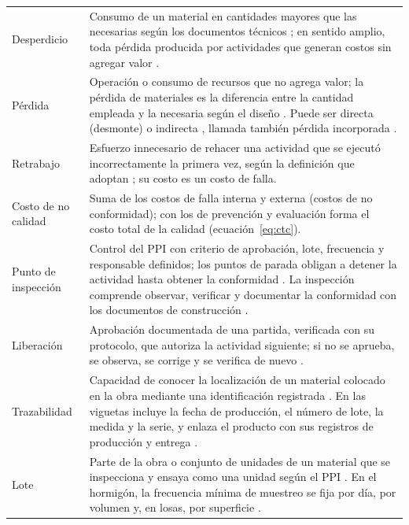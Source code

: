 \begin{longtable}{@{}P{3.1cm}P{12.7cm}@{}}
\addlinespace
Desperdicio & Consumo de un material en cantidades mayores que las necesarias según los documentos técnicos \parencite[p.~9]{galarza2011}; en sentido amplio, toda pérdida producida por actividades que generan costos sin agregar valor \parencite[p.~328]{formoso1999}. \\
\addlinespace
Pérdida & Operación o consumo de recursos que no agrega valor; la pérdida de materiales es la diferencia entre la cantidad empleada y la necesaria según el diseño \parencite[sección~2]{rossi2001}. Puede ser directa (desmonte) o indirecta \parencite[p.~15]{ccoyllo2016}, llamada también pérdida incorporada \parencite[p.~106]{maciel2016}. \\
\addlinespace
Retrabajo & Esfuerzo innecesario de rehacer una actividad que se ejecutó incorrectamente la primera vez, según la definición que adoptan \textcite[p.~2]{forcada2017}; su costo es un costo de falla. \\
\addlinespace
Costo de no calidad & Suma de los costos de falla interna y externa (costos de no conformidad); con los de prevención y evaluación forma el costo total de la calidad \parencite[p.~150]{zurita2024} (ecuación~\ref{eq:ctc}). \\
\addlinespace
Punto de inspección & Control del PPI con criterio de aprobación, lote, frecuencia y responsable definidos; los puntos de parada obligan a detener la actividad hasta obtener la conformidad \parencite[anexo~4]{muro2020}. La inspección comprende observar, verificar y documentar la conformidad con los documentos de construcción \parencite[sección~2.3]{aci318_2025}. \\
\addlinespace
Liberación & Aprobación documentada de una partida, verificada con su protocolo, que autoriza la actividad siguiente; si no se aprueba, se observa, se corrige y se verifica de nuevo \parencite[pp.~62--64]{gudiel2020}. \\
\addlinespace
Trazabilidad & Capacidad de conocer la localización de un material colocado en la obra mediante una identificación registrada \parencite[anexo~4]{muro2020}. En las viguetas incluye la fecha de producción, el número de lote, la medida y la serie, y enlaza el producto con sus registros de producción y entrega \parencite[p.~117]{capcha2016}. \\
\addlinespace
Lote & Parte de la obra o conjunto de unidades de un material que se inspecciona y ensaya como una unidad según el PPI \parencite[anexo~4]{muro2020}. En el hormigón, la frecuencia mínima de muestreo se fija por día, por volumen y, en losas, por superficie \parencite[sección~26.12.2.1]{aci318_2025}. \\

\end{longtable}
